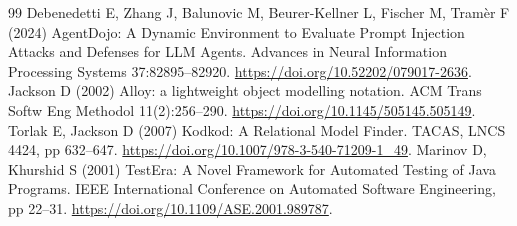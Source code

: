 \documentclass[10pt,a4paper,twocolumn]{article}
\begin{document}
\begin{thebibliography}{99}
 Debenedetti E, Zhang J, Balunovic M, Beurer-Kellner L, Fischer M, Tram\`er F (2024) AgentDojo: A Dynamic Environment to Evaluate Prompt Injection Attacks and Defenses for LLM Agents. Advances in Neural Information Processing Systems 37:82895--82920. \url{https://doi.org/10.52202/079017-2636}.
 Jackson D (2002) Alloy: a lightweight object modelling notation. ACM Trans Softw Eng Methodol 11(2):256--290. \url{https://doi.org/10.1145/505145.505149}.
 Torlak E, Jackson D (2007) Kodkod: A Relational Model Finder. TACAS, LNCS 4424, pp 632--647. \url{https://doi.org/10.1007/978-3-540-71209-1_49}.
 Marinov D, Khurshid S (2001) TestEra: A Novel Framework for Automated Testing of Java Programs. IEEE International Conference on Automated Software Engineering, pp 22--31. \url{https://doi.org/10.1109/ASE.2001.989787}.
\end{thebibliography}
\end{document}
